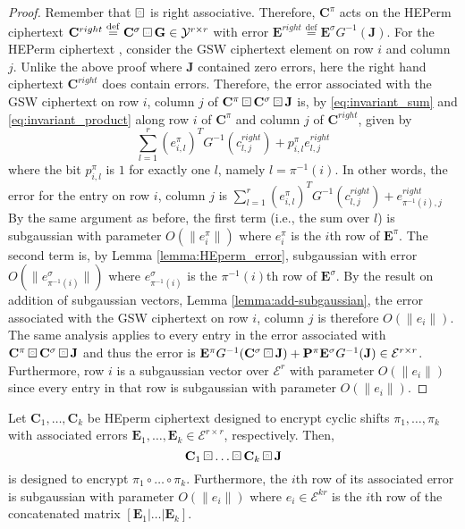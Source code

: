 \begin{proof}
    Remember that $\boxring$ is right associative. Therefore, $\mathbf{C}^\pi$ acts on the HEPerm ciphertext $\mathbf{C}^{right} \stackrel{\mathrm{def}}{=} \mathbf{C}^\sigma \boxring \mathbf{G} \in \mathcal{Y}^{r \times r}$ with error $\mathbf{E}^{right} \stackrel{\mathrm{def}}{=} \mathbf{E}^{\sigma} G^{-1}(\mathbf{J})$. For the HEPerm ciphertext , consider the GSW ciphertext element on row $i$ and column $j$. Unlike the above proof where $\mathbf{J}$ contained zero errors, here the right hand ciphertext $\mathbf{C}^{right}$ does contain errors. Therefore, the error associated with the GSW ciphertext on row $i$, column $j$ of $\mathbf{C}^{\pi} \boxring \mathbf{C}^{\sigma} \boxring \mathbf{J}$ is, by \ref{eq:invariant_sum} and \ref{eq:invariant_product} along row $i$ of $\mathbf{C}^{\pi}$ and column $j$ of $\mathbf{C}^{right}$, given by
    \begin{equation*}
        \sum\limits_{l=1}^r (e_{i,l}^{\pi})^T G^{-1}(c^{right}_{l,j}) + p^{\pi}_{i,l}e^{right}_{l,j}
    \end{equation*}
    where the bit $p^{\pi}_{i,l}$ is $1$ for exactly one $l$, namely $l = \pi^{-1}(i)$. In other words, the error for the entry on row $i$, column $j$ is $\sum\limits_{l=1}^r (e_{i,l}^{\pi})^T G^{-1}(c^{right}_{l,j}) + e^{right}_{\pi^{-1}(i),j}$ By the same argument as before, the first term (i.e., the sum over $l$) is subgaussian with parameter $O(\|e^{\pi}_i\|)$ where $e^{\pi}_i$ is the $i$th row of $\mathbf{E}^{\pi}$. The second term is, by Lemma \ref{lemma:HEperm_error}, subgaussian with error $O(\|e^{\sigma}_{\pi^{-1}(i)}\|)$ where $e^{\sigma}_{\pi^{-1}(i)}$ is the $\pi^{-1}(i)$th row of $\mathbf{E}^\sigma$. By the result on addition of subgaussian vectors, Lemma \ref{lemma:add-subgaussian}, the error associated with the GSW ciphertext on row $i$, column $j$ is therefore $O(\|e_i\|)$. The same analysis applies to every entry in the error associated with $\mathbf{C}^{\pi} \boxring \mathbf{C}^{\sigma} \boxring \mathbf{J}$ and thus the error is $\mathbf{E}^{\pi} G^{-1}(\mathbf{C}^\sigma \boxring \mathbf{J}) + \mathbf{P}^{\pi} \mathbf{E}^{\sigma}G^{-1}(\mathbf{J}) \in \mathcal{E}^{r \times r}$. Furthermore, row $i$ is a subgaussian vector over $\mathcal{E}^r$ with parameter $O(\|e_i\|)$ since every entry in that row is subgaussian with parameter $O(\|e_i\|)$. 
\end{proof}
\begin{corollary}\label{cor:HEPerm_product}
    Let $\mathbf{C}_1, \dots, \mathbf{C}_k$ be HEperm ciphertext designed to encrypt cyclic shifts $\pi_1, \dots, \pi_k$ with associated errors $\mathbf{E}_1, \dots, \mathbf{E}_k \in \mathcal{E}^{r \times r}$, respectively. Then,
    \begin{equation}
        \mathbf{C}_1 \boxring \dots \boxring \mathbf{C}_k \boxring \mathbf{J}
    \end{equation}
    is designed to encrypt $\pi_1 \circ \dots \circ \pi_k$. Furthermore, the $i$th row of its associated error is subgaussian with parameter $O(\|e_i\|)$ where $e_i \in \mathcal{E}^{kr}$ is the $i$th row of the concatenated matrix $[\mathbf{E}_1 | \dots | \mathbf{E}_k]$.
\end{corollary}

